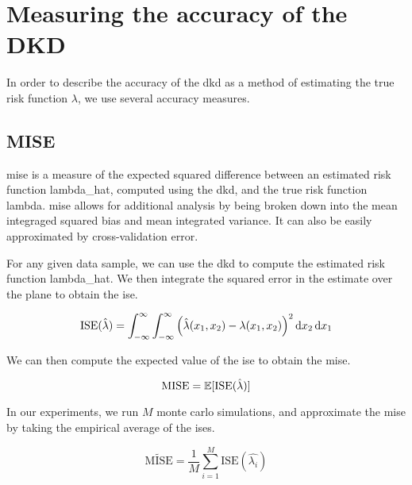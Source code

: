 \section{Measuring the accuracy of the DKD}
\label{sec:method:accuracy}

In order to describe the accuracy of the \gls{dkd} as a method of estimating the true risk function $\lambda$,
we use several accuracy measures.

\subsection{MISE}
\label{subsec:method:mise}

\Gls{mise} is a measure of the expected squared difference between an estimated risk function \gls{lambda_hat},
computed using the \gls{dkd}, and the true risk function \gls{lambda}.
\Gls{mise} allows for additional analysis by being broken down into the mean integraged squared bias and mean integrated variance.
It can also be easily approximated by cross-validation error.

For any given data sample, we can use the \gls{dkd} to compute the estimated risk function \gls{lambda_hat}.
We then integrate the squared error in the estimate over the plane to obtain the \gls{ise}.

\begin{equation}
\label{eq:ise}
    \mbox{ISE}(\hat{\lambda}) = 
        \int_{-\infty}^{\infty} \int_{-\infty}^{\infty}
            \left(
                \hat{\lambda}(x_1, x_2) - \lambda(x_1, x_2)
            \right)^2 \mathop{}\!\mathrm{d}{x_2} \mathop{}\!\mathrm{d}{x_1}
\end{equation}

We can then compute the expected value of the \gls{ise} to obtain the \gls{mise}.

\begin{equation}
\label{eq:mise}
    \mbox{MISE} = \mathbb{E} [\mbox{ISE}(\hat{\lambda})]
\end{equation}

In our experiments, we run $M$ monte carlo simulations, and approximate the \gls{mise} by taking the empirical average of the \glspl{ise}.

\begin{equation}
\label{eq:mise_tilde}
    \widetilde{\mbox{MISE}} = \frac{1}{M} \sum_{i=1}^{M} \mbox{ISE}(\hat{\lambda_i})
\end{equation}


